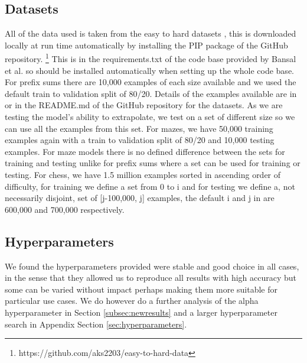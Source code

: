 \subsection{Datasets}
All of the data used is taken from the easy to hard datasets \cite{Schwarzschild2021datasets}, this is downloaded locally at run time automatically by installing the PIP package of the GitHub repository. \footnote{https://github.com/aks2203/easy-to-hard-data} This is in the requirements.txt of the code base provided by Bansal et al. so should be installed automatically when setting up the whole code base.
For prefix sums there are 10,000 examples of each size available and we used the default train to validation split of 80/20. Details of the examples available are in \cite{Schwarzschild2021datasets} or in the README.md of the GitHub repository for the datasets. As we are testing the model's ability to extrapolate, we test on a set of different size so we can use all the examples from this set. For mazes, we have 50,000 training examples again with a train to validation split of 80/20 and 10,000 testing examples. For maze models there is no defined difference between the sets for training and testing unlike for prefix sums where a set can be used for training or testing. For chess, we have 1.5 million examples sorted in ascending order of difficulty, for training we define a set from 0 to i and for testing we define a, not necessarily disjoint, set of [j-100,000, j] examples, the default i and j in \cite{bansal2022endtoend} are 600,000 and 700,000 respectively.

\subsection{Hyperparameters}

We found the hyperparameters provided were stable and good choice in all cases, in the sense that they allowed us to reproduce all results with high accuracy but some can be varied without impact perhaps making them more suitable for particular use cases. We do however do a further analysis of the alpha hyperparameter in Section \ref{subsec:newresults} and a larger hyperparameter search in Appendix Section \ref{sec:hyperparameters}.


